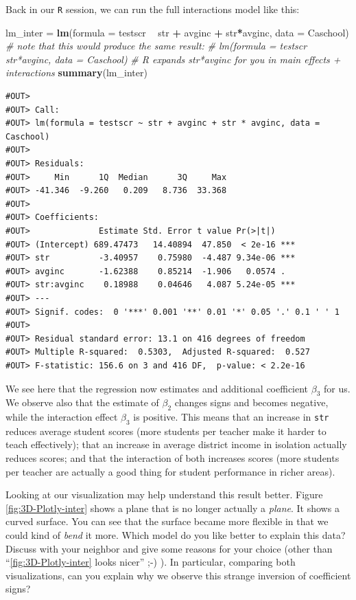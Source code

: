 \documentclass[]{book}
\newenvironment{Shaded}{\begin{snugshade}}{\end{snugshade}}
\newcommand{\KeywordTok}[1]{\textcolor[rgb]{0.13,0.29,0.53}{\textbf{#1}}}
\newcommand{\DataTypeTok}[1]{\textcolor[rgb]{0.13,0.29,0.53}{#1}}
\newcommand{\StringTok}[1]{\textcolor[rgb]{0.31,0.60,0.02}{#1}}
\newcommand{\CommentTok}[1]{\textcolor[rgb]{0.56,0.35,0.01}{\textit{#1}}}
\newcommand{\OperatorTok}[1]{\textcolor[rgb]{0.81,0.36,0.00}{\textbf{#1}}}
\newcommand{\NormalTok}[1]{#1}
\theoremstyle{definition}
\theoremstyle{definition}
\theoremstyle{definition}
\theoremstyle{remark}
\begin{document}
Back in our \texttt{R} session, we can run the full interactions model
like this:

\begin{Shaded}
\begin{Highlighting}[]
\NormalTok{lm_inter =}\StringTok{ }\KeywordTok{lm}\NormalTok{(}\DataTypeTok{formula =}\NormalTok{ testscr }\OperatorTok{~}\StringTok{ }\NormalTok{str }\OperatorTok{+}\StringTok{ }\NormalTok{avginc }\OperatorTok{+}\StringTok{ }\NormalTok{str}\OperatorTok{*}\NormalTok{avginc, }\DataTypeTok{data =}\NormalTok{ Caschool)}
\CommentTok{# note that this would produce the same result:}
\CommentTok{# lm(formula = testscr ~ str*avginc, data = Caschool)}
\CommentTok{# R expands str*avginc for you in main effects + interactions}
\KeywordTok{summary}\NormalTok{(lm_inter)}
\end{Highlighting}
\end{Shaded}

\begin{verbatim}
#OUT> 
#OUT> Call:
#OUT> lm(formula = testscr ~ str + avginc + str * avginc, data = Caschool)
#OUT> 
#OUT> Residuals:
#OUT>     Min      1Q  Median      3Q     Max 
#OUT> -41.346  -9.260   0.209   8.736  33.368 
#OUT> 
#OUT> Coefficients:
#OUT>              Estimate Std. Error t value Pr(>|t|)    
#OUT> (Intercept) 689.47473   14.40894  47.850  < 2e-16 ***
#OUT> str          -3.40957    0.75980  -4.487 9.34e-06 ***
#OUT> avginc       -1.62388    0.85214  -1.906   0.0574 .  
#OUT> str:avginc    0.18988    0.04646   4.087 5.24e-05 ***
#OUT> ---
#OUT> Signif. codes:  0 '***' 0.001 '**' 0.01 '*' 0.05 '.' 0.1 ' ' 1
#OUT> 
#OUT> Residual standard error: 13.1 on 416 degrees of freedom
#OUT> Multiple R-squared:  0.5303,  Adjusted R-squared:  0.527 
#OUT> F-statistic: 156.6 on 3 and 416 DF,  p-value: < 2.2e-16
\end{verbatim}

We see here that the regression now estimates and additional coefficient
\(\beta_3\) for us. We observe also that the estimate of \(\beta_2\)
changes signs and becomes negative, while the interaction effect
\(\beta_3\) is positive. This means that an increase in \texttt{str}
reduces average student scores (more students per teacher make it harder
to teach effectively); that an increase in average district income in
isolation actually reduces scores; and that the interaction of both
increases scores (more students per teacher are actually a good thing
for student performance in richer areas).

Looking at our visualization may help understand this result better.
Figure \ref{fig:3D-Plotly-inter} shows a plane that is no longer
actually a \emph{plane}. It shows a curved surface. You can see that the
surface became more flexible in that we could kind of \emph{bend} it
more. Which model do you like better to explain this data? Discuss with
your neighbor and give some reasons for your choice (other than
``\ref{fig:3D-Plotly-inter} looks nicer'' ;-) ). In particular,
comparing both visualizations, can you explain why we observe this
strange inversion of coefficient signs?
\end{document}
